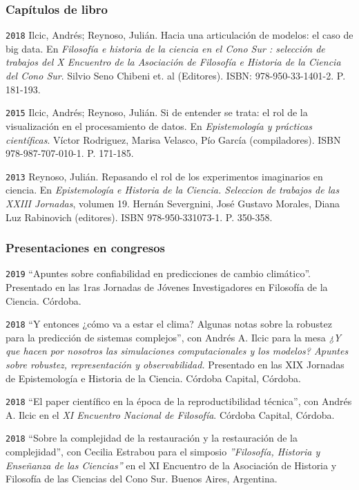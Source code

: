 \documentclass[]{article}
\begin{document}
\hypertarget{capuxedtulos-de-libro}{%
\subsubsection{Capítulos de libro}\label{capuxedtulos-de-libro}}

\texttt{2018} Ilcic, Andrés; Reynoso, Julián. Hacia una articulación de
modelos: el caso de big data. En \emph{Filosofía e historia de la
ciencia en el Cono Sur : selección de trabajos del X Encuentro de la
Asociación de Filosofía e Historia de la Ciencia del Cono Sur}. Silvio
Seno Chibeni et. al (Editores). ISBN: 978-950-33-1401-2. P. 181-193.

\texttt{2015} Ilcic, Andrés; Reynoso, Julián. Si de entender se trata:
el rol de la visualización en el procesamiento de datos. En
\emph{Epistemología y prácticas científicas}. Víctor Rodriguez, Marisa
Velasco, Pío García (compiladores). ISBN 978-987-707-010-1. P. 171-185.

\texttt{2013} Reynoso, Julián. Repasando el rol de los experimentos
imaginarios en ciencia. En \emph{Epistemología e Historia de la Ciencia.
Seleccion de trabajos de las XXIII Jornadas}, volumen 19. Hernán
Severgnini, José Gustavo Morales, Diana Luz Rabinovich (editores). ISBN
978-950-331073-1. P. 350-358.

\hypertarget{presentaciones-en-congresos}{%
\subsubsection{Presentaciones en
congresos}\label{presentaciones-en-congresos}}

\texttt{2019} ``Apuntes sobre confiabilidad en predicciones de cambio
climático''. Presentado en las 1ras Jornadas de Jóvenes Investigadores
en Filosofía de la Ciencia. Córdoba.

\texttt{2018} ``Y entonces ¿cómo va a estar el clima? Algunas notas
sobre la robustez para la predicción de sistemas complejos'', con Andrés
A. Ilcic para la mesa \emph{¿Y que hacen por nosotros las simulaciones
computacionales y los modelos? Apuntes sobre robustez, representación y
observabilidad.} Presentado en las XIX Jornadas de Epistemología e
Historia de la Ciencia. Córdoba Capital, Córdoba.

\texttt{2018} ``El paper científico en la época de la reproductibilidad
técnica'', con Andrés A. Ilcic en el \emph{XI Encuentro Nacional de
Filosofía}. Córdoba Capital, Córdoba.

\texttt{2018} ``Sobre la complejidad de la restauración y la
restauración de la complejidad'', con Cecilia Estrabou para el simposio
\emph{''Filosofía, Historia y Enseñanza de las Ciencias''} en el XI
Encuentro de la Asociación de Historia y Filosofía de las Ciencias del
Cono Sur. Buenos Aires, Argentina.
\end{document}
